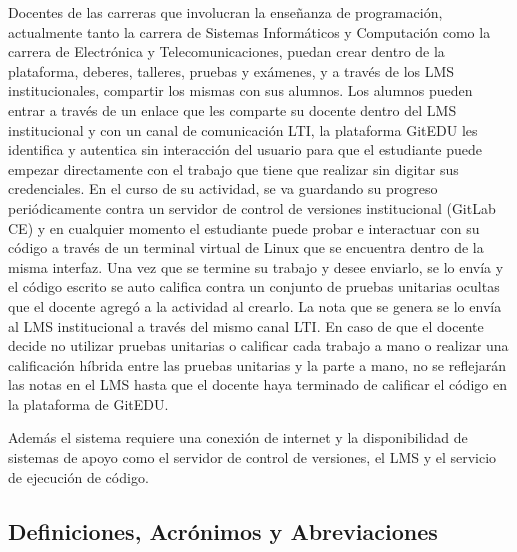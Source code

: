 Docentes de las carreras que involucran la enseñanza de programación, actualmente tanto la carrera de Sistemas Informáticos y Computación como la carrera de Electrónica y Telecomunicaciones, puedan crear dentro de la plataforma, deberes, talleres, pruebas y exámenes, y a través de los LMS institucionales, compartir los mismas con sus alumnos. Los alumnos pueden entrar a través de un enlace que les comparte su docente dentro del LMS institucional y con un canal de comunicación LTI, la plataforma GitEDU les identifica y autentica sin interacción del usuario para que el estudiante puede empezar directamente con el trabajo que tiene que realizar sin digitar sus credenciales. En el curso de su actividad, se va guardando su progreso periódicamente contra un servidor de control de versiones institucional (GitLab CE) y en cualquier momento el estudiante puede probar e interactuar con su código a través de un terminal virtual de Linux que se encuentra dentro de la misma interfaz. Una vez que se termine su trabajo y desee enviarlo, se lo envía y el código escrito se auto califica contra un conjunto de pruebas unitarias ocultas que el docente agregó a la actividad al crearlo. La nota que se genera se lo envía al LMS institucional a través del mismo canal LTI. En caso de que el docente decide no utilizar pruebas unitarias o calificar cada trabajo a mano o realizar una calificación híbrida entre las pruebas unitarias y la parte a mano, no se reflejarán las notas en el LMS hasta que el docente haya terminado de calificar el código en la plataforma de GitEDU.

Además el sistema requiere una conexión de internet y la disponibilidad de sistemas de apoyo como el servidor de control de versiones, el LMS y el servicio de ejecución de código.

\subsection{Definiciones, Acrónimos y Abreviaciones}

